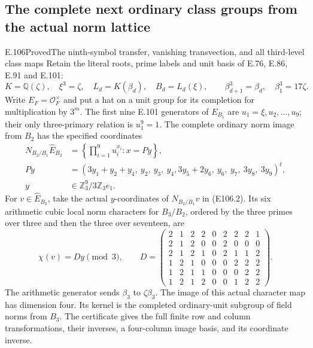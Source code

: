 \subsection{The complete next ordinary class groups from the actual norm lattice}

\begin{statement}{E.106}{Proved}{The ninth-symbol transfer, vanishing transvection, and all third-level class maps}
Retain the literal roots, prime labels and unit basis of E.76,
E.86, E.91 and E.101:
\[
 K=\mathbb Q(\zeta),\quad \xi^3=\zeta,\quad
 L_d=K(\beta_d),\quad B_d=L_d(\xi),\qquad
 \beta_{d+1}^3=\beta_d,\quad\beta_1^3=17\zeta.
 \tag{E106.1}
\]
Write $E_F=\mathcal O_F^\times$ and put a hat on a unit group
for its completion for multiplication by $3^m$. The first nine
E.101 generators of $E_{B_1}$ are $u_1=\xi,u_2,\ldots,u_9$;
their only three-primary relation is $u_1^9=1$.
The complete ordinary norm image from $B_2$ has the specified coordinates
\[
 \begin{aligned}
 N_{B_2/B_1}\widehat E_{B_2}
 &=\left\{\prod_{i=1}^9u_i^{x_i}:x=P y\right\},\\
 Py&=(3y_1+y_2+y_4,\ y_2,\ y_3,\ y_4,
             3y_5+2y_6,\ y_6,\ y_7,\ 3y_8,\ 3y_9)^t,\\
 y&\in\mathbb Z_3^9/3\mathbb Z_3e_1 .
 \end{aligned}
 \tag{E106.2}
\]
For $v\in\widehat E_{B_2}$, take the actual $y$-coordinates
of $N_{B_2/B_1}v$ in (E106.2). Its six arithmetic cubic
local norm characters for $B_3/B_2$, ordered by the three
primes over three and then the three over seventeen, are
\[
 \chi(v)=D y\pmod3,\qquad
 D=\begin{pmatrix}
 2&1&2&2&0&2&2&2&1\\
 2&1&2&0&0&2&0&0&0\\
 2&1&2&1&0&2&1&1&2\\
 1&2&1&0&0&0&2&2&2\\
 1&2&1&1&0&0&0&2&2\\
 1&2&1&2&0&0&1&2&2
 \end{pmatrix}.
 \tag{E106.3}
\]
The arithmetic generator sends $\beta_3$ to $\zeta\beta_3$.
The image of this actual character map has dimension four.
Its kernel is the completed ordinary-unit subgroup of field
norms from $B_3$. The certificate gives the full finite row
and column transformations, their inverses, a four-column
image basis, and its coordinate inverse.


\end{statement}
